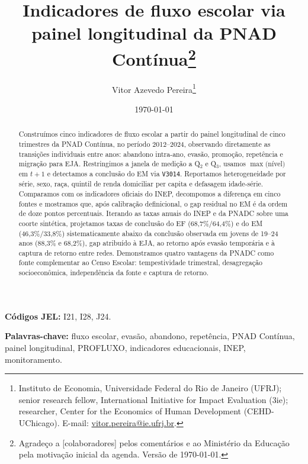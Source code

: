 \documentclass[12pt]{article}
\title{Indicadores de fluxo escolar via painel longitudinal da PNAD Cont\'inua\thanks{
       Agradeço a [colaboradores] pelos comentários e ao Ministério da Educação
       pela motivação inicial da agenda. Versão de \today.}}
\author{Vitor Azevedo Pereira\thanks{Instituto de Economia, Universidade Federal do Rio de Janeiro (UFRJ);
        senior research fellow, International Initiative for Impact Evaluation (3ie);
        researcher, Center for the Economics of Human Development (CEHD-UChicago).
        E-mail: \href{mailto:vitor.pereira@ie.ufrj.br}{vitor.pereira@ie.ufrj.br}.}}
\date{\today}
\begin{document}
\maketitle
\thispagestyle{empty}

\begin{abstract}
\noindent \singlespacing
Constru\'imos cinco indicadores de fluxo escolar a partir do painel longitudinal de
cinco trimestres da PNAD Cont\'inua, no per\'iodo 2012--2024, observando diretamente
as transi\c{c}\~oes individuais entre anos: abandono intra-ano, evas\~ao, promo\c{c}\~ao,
repet\^encia e migra\c{c}\~ao para EJA. Restringimos a janela de medi\c{c}\~ao a
Q$_2$ e Q$_3$, usamos $\max($n\'ivel$)$ em $t+1$ e detectamos a conclus\~ao do EM via
\texttt{V3014}. Reportamos heterogeneidade por s\'erie, sexo, ra\c{c}a, quintil de
renda domiciliar per capita e defasagem idade-s\'erie. Comparamos com os indicadores
oficiais do INEP, decompomos a diferen\c{c}a em cinco fontes e mostramos que, ap\'os
calibra\c{c}\~ao definicional, o gap residual no EM \'e da ordem de doze pontos
percentuais. Iterando as taxas anuais do INEP e da PNADC sobre uma coorte sint\'etica,
projetamos taxas de conclus\~ao do EF (68,7\%/64,4\%) e do EM (46,3\%/33,8\%)
sistematicamente abaixo da conclus\~ao observada em jovens de 19--24 anos (88,3\% e
68,2\%), gap atribu\'ido \`a EJA, ao retorno ap\'os evas\~ao tempor\'aria e \`a
captura de retorno entre redes. Demonstramos quatro vantagens da PNADC como
fonte complementar ao Censo Escolar: tempestividade trimestral, desagrega\c{c}\~ao
socioecon\^omica, independ\^encia da fonte e captura de retorno.
\end{abstract}

\vspace{1em}
\noindent \textbf{C\'odigos JEL:} I21, I28, J24.

\vspace{0.5em}
\noindent \textbf{Palavras-chave:} fluxo escolar, evas\~ao, abandono, repet\^encia, PNAD Cont\'inua,
painel longitudinal, PROFLUXO, indicadores educacionais, INEP, monitoramento.

\newpage
\setcounter{page}{1}
\doublespacing












\appendix



\newpage
\singlespacing


\end{document}
